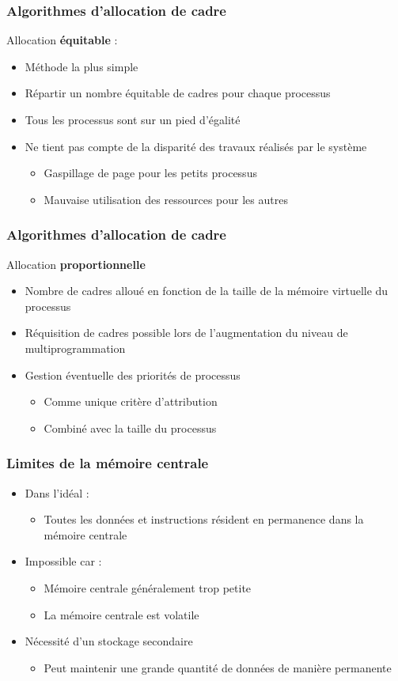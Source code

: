 \begin{frame}
\frametitle{Algorithmes d'allocation de cadre}
Allocation \textbf{équitable} :
\begin{itemize}
\item Méthode la plus simple
\item Répartir un nombre équitable de cadres pour chaque processus
\item Tous les processus sont sur un pied d'égalité
\item Ne tient pas compte de la disparité des travaux réalisés par le système
\begin{itemize}
\item Gaspillage de page pour les petits processus
\item Mauvaise utilisation des ressources pour les autres
\end{itemize}
\end{itemize}
\end{frame}

\begin{frame}
\frametitle{Algorithmes d'allocation de cadre}
Allocation \textbf{proportionnelle}
\begin{itemize}
\item Nombre de cadres alloué en fonction de la taille de la mémoire virtuelle du processus
\item Réquisition de cadres possible lors de l'augmentation du niveau de multiprogrammation
\item Gestion éventuelle des priorités de processus
\begin{itemize}
\item Comme unique critère d'attribution
\item Combiné avec la taille du processus
\end{itemize}
\end{itemize}
\end{frame}

\begin{frame}
\frametitle{Limites de la mémoire centrale}
\begin{itemize}
\item Dans l’idéal :
\begin{itemize}
\item Toutes les données et instructions résident en permanence dans la mémoire centrale
\end{itemize}
\item Impossible car :
\begin{itemize}
\item Mémoire centrale généralement trop petite
\item La mémoire centrale est volatile
\end{itemize}
\item Nécessité d’un stockage secondaire
\begin{itemize}
\item Peut maintenir une grande quantité de données de manière permanente
\end{itemize}
\end{itemize}
\end{frame}

